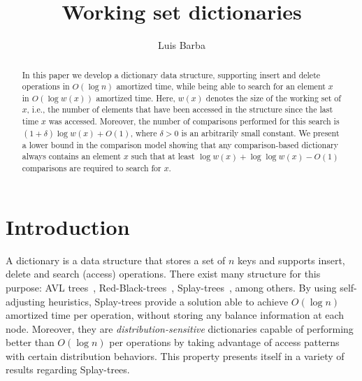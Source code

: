 \documentclass[11pt]{article}       %
\begin{document}


\title{Working set dictionaries}


\author{Luis Barba} %

\maketitle

\begin{abstract}
In this paper we develop a dictionary data structure, supporting insert and delete operations in $O(\log n)$ amortized time, while being able to search for an element $x$ in $O(\log w(x))$ amortized time. Here, $w(x)$ denotes the size of the working set of $x$, i.e., the number of elements that have been accessed in the structure since the last time $x$ was accessed. Moreover, the number of comparisons performed for this search is $(1+\delta)\log w(x) + O(1)$, where $\delta>0$ is an arbitrarily small constant. 
We present a lower bound in the comparison model showing that any comparison-based dictionary always contains an element $x$ such that at least $\log w(x) + \log\log w(x) - O(1)$ comparisons are required to search for $x$.
\end{abstract}

\section{Introduction}
A dictionary is a data structure that stores a set of $n$ keys and supports insert, delete and search (access) operations.
There exist many structure for this purpose: AVL trees~\cite{adelsonvelskii1963algorithm}, Red-Black-trees~\cite{guibas1978dichromatic}, Splay-trees~\cite{sleator1985self}, among others. By using self-adjusting heuristics, Splay-trees provide a solution able to achieve $O(\log n)$ amortized time per operation, without storing any balance information at each node. Moreover, they are \emph{distribution-sensitive} dictionaries capable of performing better than $O(\log n)$ per operations by taking advantage of access patterns with certain distribution behaviors. 
This property presents itself in a variety of results regarding Splay-trees.
\end{document}
